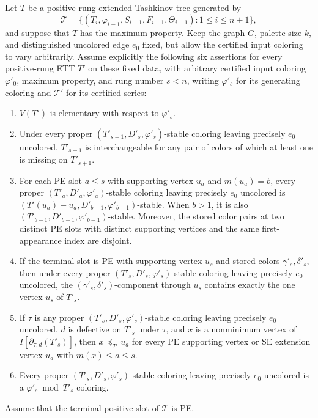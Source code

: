 \begin{helper}
Let \(T\) be a positive-rung extended Tashkinov tree generated by
\[
 \mathcal T=\{(T_i,\varphi_{i-1},S_{i-1},F_{i-1},\Theta_{i-1}):
                   1\leq i\leq n+1\},
\]
and suppose that \(T\) has the maximum property. Keep the graph \(G\),
palette size \(k\), and distinguished uncolored edge \(e_0\) fixed, but
allow the certified input coloring to vary arbitrarily. Assume explicitly
the following six assertions for every positive-rung ETT \(T'\) on these
fixed data, with arbitrary certified input coloring \(\varphi'_0\), maximum
property, and rung number \(s<n\), writing \(\varphi'_s\) for its generating
coloring and \(\mathcal T'\) for its certified series:
\begin{enumerate}
\item \(V(T')\) is elementary with respect to \(\varphi'_s\).
\item Under every proper \((T'_{s+1},D'_s,\varphi'_s)\)-stable coloring
leaving precisely \(e_0\) uncolored, \(T'_{s+1}\) is interchangeable for
any pair of colors of which at least one is missing on \(T'_{s+1}\).
\item For each PE slot \(a\leq s\) with supporting vertex \(u_a\) and
\(m(u_a)=b\), every proper \((T'_a,D'_a,\varphi'_a)\)-stable coloring
leaving precisely \(e_0\) uncolored is
\((T'(u_a)-u_a,D'_{b-1},\varphi'_{b-1})\)-stable. When \(b>1\), it is
also \((T'_{b-1},D'_{b-1},\varphi'_{b-1})\)-stable. Moreover, the stored
color pairs at two distinct PE slots with distinct supporting vertices
and the same first-appearance index are disjoint.
\item If the terminal slot is PE with supporting vertex \(u_s\) and
stored colors \(\gamma'_s,\delta'_s\), then under every proper
\((T'_s,D'_s,\varphi'_s)\)-stable coloring leaving precisely \(e_0\)
uncolored, the \((\gamma'_s,\delta'_s)\)-component through \(u_s\)
contains exactly the one vertex \(u_s\) of \(T'_s\).
\item If \(\tau\) is any proper \((T'_s,D'_s,\varphi'_s)\)-stable
coloring leaving precisely \(e_0\) uncolored, \(d\) is defective on
\(T'_s\) under \(\tau\), and \(x\) is a nonminimum vertex of
\(I[\partial_{\tau,d}(T'_s)]\), then
\(x\preceq_{T'}u_a\) for every PE supporting vertex or SE extension
vertex \(u_a\) with \(m(x)\leq a\leq s\).
\item Every proper \((T'_s,D'_s,\varphi'_s)\)-stable coloring leaving
precisely \(e_0\) uncolored is a \(\varphi'_s\bmod T'_s\) coloring.
\end{enumerate}
Assume that the terminal positive slot of \(\mathcal T\) is PE.


\end{helper}
